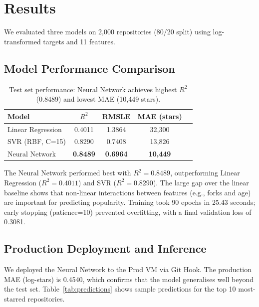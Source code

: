 \section{Results}

We evaluated three models on 2{,}000 repositories (80/20 split) using log-transformed targets and 11 features.

\subsection{Model Performance Comparison}

\begin{table}[h]
  \centering
  \begin{tabular}{lcccc}
    \toprule
    \textbf{Model} & \textbf{$R^2$} & \textbf{RMSLE} & \textbf{MAE (stars)} \\
    \midrule
    Linear Regression  & 0.4011 & 1.3864 & 32{,}300 \\
    SVR (RBF, C=15)    & 0.8290 & 0.7408 & 13{,}826 \\
    Neural Network     & \textbf{0.8489} & \textbf{0.6964} & \textbf{10{,}449} \\
    \bottomrule
  \end{tabular}
  \caption{Test set performance: Neural Network achieves highest $R^2$ (0.8489) and lowest MAE (10{,}449 stars).}
  \label{tab:model-results}
\end{table}

The Neural Network performed best with $R^2=0.8489$, outperforming Linear Regression ($R^2=0.4011$) and SVR ($R^2=0.8290$). The large gap over the linear baseline shows that non-linear interactions between features (e.g., forks and age) are important for predicting popularity. Training took 90 epochs in 25.43 seconds; early stopping (patience=10) prevented overfitting, with a final validation loss of 0.3081.

\subsection{Production Deployment and Inference}

We deployed the Neural Network to the Prod VM via Git Hook. The production MAE (log-stars) is 0.4540, which confirms that the model generalises well beyond the test set. Table~\ref{tab:predictions} shows sample predictions for the top 10 most-starred repositories.

